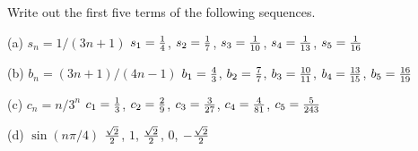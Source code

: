 
Write out the first five terms of the following sequences.

\medskip
(a) $s_n=1/(3n+1)$
\medskip
$s_1={1\over4}$,
$s_2={1\over7}$,
$s_3={1\over10}$,
$s_4={1\over13}$,
$s_5={1\over16}$

\medskip
(b) $b_n=(3n+1)/(4n-1)$
\medskip
$b_1={4\over3}$,
$b_2={7\over7}$,
$b_3={10\over11}$,
$b_4={13\over15}$,
$b_5={16\over19}$

\medskip
(c) $c_n=n/3^n$
\medskip
$c_1={1\over3}$,
$c_2={2\over9}$,
$c_3={3\over27}$,
$c_4={4\over81}$,
$c_5={5\over243}$

\medskip
(d) $\sin(n\pi/4)$
\medskip
$\sqrt2\over2$,
$1$,
$\sqrt2\over2$,
$0$,
$-{\sqrt2\over2}$
